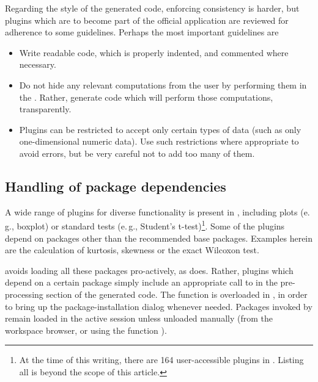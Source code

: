 Regarding the style of the generated  code, enforcing consistency is harder,
but plugins which are to become part of the official  application are
reviewed for adherence to some guidelines. Perhaps the most important guidelines
are 

\begin{itemize}
  \item 
  Write readable code, which is properly indented, and commented where necessary.

  \item 
  Do not hide any relevant computations from the user by performing them in the
  . Rather, generate  code which will perform
  those computations, transparently.

  \item
  Plugins can be restricted to accept only certain types of data (such as only one-dimensional numeric data).
  Use such restrictions where appropriate to avoid errors, but be very careful not to add
  too many of them.
\end{itemize}

\subsection[Handling of R package dependencies]{Handling of  package dependencies}
\label{sec:technical_plugins_dependencies}
A wide range of plugins for diverse functionality is present in ,
including plots (e.\,g., boxplot) or standard tests (e.\,g., Student's t-test)\footnote{
  At the time of this writing, there are 164 user-accessible plugins in .
  Listing all is beyond the scope of this article.
}. Some
of the plugins depend on  packages other than the recommended  base packages.
Examples herein are the calculation of kurtosis, skewness or the exact Wilcoxon
test.

 avoids loading all these packages pro-actively, as  does. Rather,
plugins which depend on a certain package simply include an appropriate call to
 in the pre-processing section of the generated  code. The 
function is overloaded in , in order to bring up the package-installation
dialog whenever needed. Packages invoked by  remain loaded
in the active  session unless unloaded manually (from the workspace browser, or using the
 function ).

